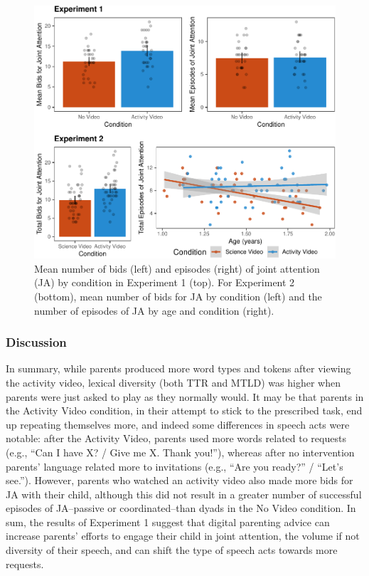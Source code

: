 \documentclass[man,floatsintext]{apa6}
\begin{document}
\begin{figure}[H]

{\centering \includegraphics{figs/fig-JA-1} 

}

\caption{\label{fig:JA} Mean number of bids (left) and episodes (right) of joint attention (JA) by condition in Experiment 1 (top). For Experiment 2 (bottom), mean number of bids for JA by condition (left) and the number of episodes of JA by age and condition (right).}\label{fig:fig-JA}
\end{figure}

\hypertarget{discussion}{%
\subsubsection{Discussion}\label{discussion}}

In summary, while parents produced more word types and tokens after viewing the activity video, lexical diversity (both TTR and MTLD) was higher when parents were just asked to play as they normally would.
It may be that parents in the Activity Video condition, in their attempt to stick to the prescribed task, end up repeating themselves more, and indeed some differences in speech acts were notable:
after the Activity Video, parents used more words related to requests (e.g., \enquote{Can I have X? / Give me X. Thank you!}), whereas after no intervention parents' language related more to invitations (e.g., \enquote{Are you ready?} / \enquote{Let's see.}).
However, parents who watched an activity video also made more bids for JA with their child, although this did not result in a greater number of successful episodes of JA--passive or coordinated--than dyads in the No Video condition.
In sum, the results of Experiment 1 suggest that digital parenting advice can increase parents' efforts to engage their child in joint attention, the volume if not diversity of their speech, and can shift the type of speech acts towards more requests.
\end{document}
